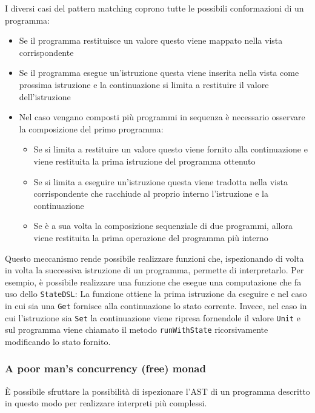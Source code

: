 I diversi casi del pattern matching coprono tutte le possibili conformazioni di un programma:
\begin{itemize}
  \item Se il programma restituisce un valore questo viene mappato nella vista corrispondente
  \item Se il programma esegue un'istruzione questa viene inserita nella vista come prossima istruzione e la continuazione si limita a restituire il valore dell'istruzione
  \item Nel caso vengano composti più programmi in sequenza è necessario osservare la composizione del primo programma:
        \begin{itemize}
          \item Se si limita a restituire un valore questo viene fornito alla continuazione e viene restituita la prima istruzione del programma ottenuto
          \item Se si limita a eseguire un'istruzione questa viene tradotta nella vista corrispondente che racchiude al proprio interno l'istruzione e la continuazione
          \item Se è a sua volta la composizione sequenziale di due programmi, allora viene restituita la prima operazione del programma più interno
        \end{itemize}
\end{itemize}

Questo meccanismo rende possibile realizzare funzioni che, ispezionando di volta in volta la successiva istruzione di un programma, permette di interpretarlo. Per esempio, è possibile realizzare una funzione che esegue una computazione che fa uso dello \lstinline{StateDSL}:
La funzione ottiene la prima istruzione da eseguire e nel caso in cui sia una \lstinline{Get} fornisce alla continuazione lo stato corrente. Invece, nel caso in cui l'istruzione sia \lstinline{Set} la continuazione viene ripresa fornendole il valore \lstinline{Unit} e sul programma viene chiamato il metodo \lstinline{runWithState} ricorsivamente modificando lo stato fornito.

\subsubsection{A poor man’s concurrency (free) monad}
\label{sec:poor-man}
È possibile sfruttare la possibilità di ispezionare l'AST di un programma descritto in questo modo per realizzare interpreti più complessi.


